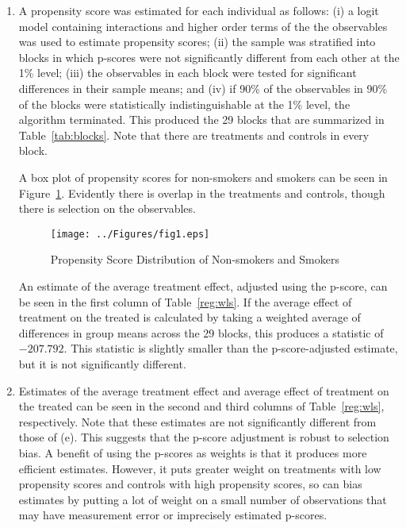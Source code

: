 \documentclass{article}
\begin{document}
\begin{enumerate}
\begin{enumerate}
\item A propensity score was estimated for each individual as follows: (i) a logit model containing interactions and higher order terms of the the observables was used to estimate propensity scores; (ii) the sample was stratified into blocks in which p-scores were not significantly different from each other at the 1\% level; (iii) the observables in each block were tested for significant differences in their sample means; and (iv) if 90\% of the observables in 90\% of the blocks were statistically indistinguishable at the 1\% level, the algorithm terminated. This produced the 29 blocks that are summarized in Table~\ref{tab:blocks}. Note that there are treatments and controls in every block.



A box plot of propensity scores for non-smokers and smokers can be seen in Figure~\ref{fig:boxplot}. Evidently there is overlap in the treatments and controls, though there is selection on the observables.

\begin{figure}[htbp!]
\centering
\texttt{[image: ../Figures/fig1.eps]}
\caption{Propensity Score Distribution of Non-smokers and Smokers}
\label{fig:boxplot}
\end{figure}

An estimate of the average treatment effect, adjusted using the p-score, can be seen in the first column of Table~\ref{reg:wls}. If the average effect of treatment on the treated is calculated by taking a weighted average of differences in group means across the 29 blocks, this produces a statistic of $-207.792$. This statistic is slightly smaller than the p-score-adjusted estimate, but it is not significantly different.

\item Estimates of the average treatment effect and average effect of treatment on the treated can be seen in the second and third columns of Table~\ref{reg:wls}, respectively. Note that these estimates are not significantly different from those of (e). This suggests that the p-score adjustment is robust to selection bias. A benefit of using the p-scores as weights is that it produces more efficient estimates. However, it puts greater weight on treatments with low propensity scores and controls with high propensity scores, so can bias estimates by putting a lot of weight on a small number of observations that may have measurement error or imprecisely estimated p-scores.


\end{enumerate}
\end{enumerate}
\end{document}
